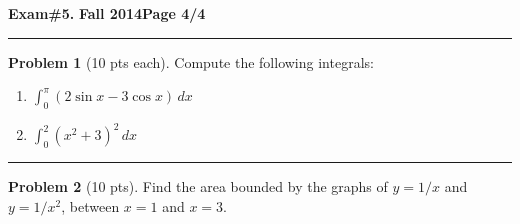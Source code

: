 \documentclass[12pt]{article}
\theoremstyle{definition}
\newtheorem{problem}{Problem}
\begin{document}
\hfill{\large\bf Exam\#5.}\hfill{\large\bf
Fall 2014}\hfill{\large\bf Page 4/4}\hrule

\bigskip

\begin{problem}[10 pts each] 
Compute the following integrals:
\begin{enumerate}
\item $\displaystyle{\int_0^{\pi} (2\sin x - 3\cos x) \, dx}$
\vspace{3.5cm}
\begin{flushright}
\end{flushright}
\item $\displaystyle{\int_0^2 (x^2+3)^2\, dx}$
\vspace{4cm}
\begin{flushright}
\end{flushright}
\end{enumerate}
\end{problem}
\hrule

\begin{problem}[10 pts] 
Find the area bounded by the graphs of $y=1/x$ and $y=1/x^2$, between $x=1$ and $x=3$.

\vspace{6cm}
\begin{flushright}
\end{flushright}
\end{problem}
\end{document}
